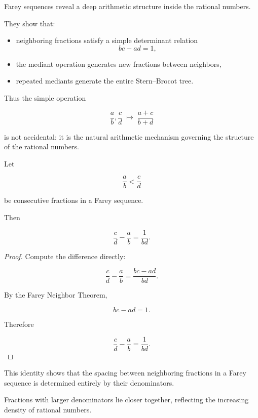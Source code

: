\begin{remark}
Farey sequences reveal a deep arithmetic structure inside the
rational numbers.

They show that:

\begin{itemize}
\item neighboring fractions satisfy a simple determinant relation
\[
bc - ad = 1,
\]

\item the mediant operation generates new fractions between neighbors,

\item repeated mediants generate the entire Stern–Brocot tree.
\end{itemize}

Thus the simple operation

\[
\frac{a}{b},\frac{c}{d}
\;\mapsto\;
\frac{a+c}{b+d}
\]

is not accidental: it is the natural arithmetic mechanism governing
the structure of the rational numbers.
\end{remark}

\begin{theorem}
\label{thm:farey-gap}

Let

\[
\frac{a}{b} < \frac{c}{d}
\]

be consecutive fractions in a Farey sequence.

Then

\[
\frac{c}{d} - \frac{a}{b}
=
\frac{1}{bd}.
\]

\end{theorem}

\begin{proof}

Compute the difference directly:

\[
\frac{c}{d} - \frac{a}{b}
=
\frac{bc - ad}{bd}.
\]

By the Farey Neighbor Theorem,

\[
bc - ad = 1.
\]

Therefore

\[
\frac{c}{d} - \frac{a}{b}
=
\frac{1}{bd}.
\]

\end{proof}

\begin{remark}
This identity shows that the spacing between neighboring fractions in
a Farey sequence is determined entirely by their denominators.

Fractions with larger denominators lie closer together, reflecting
the increasing density of rational numbers.
\end{remark}

